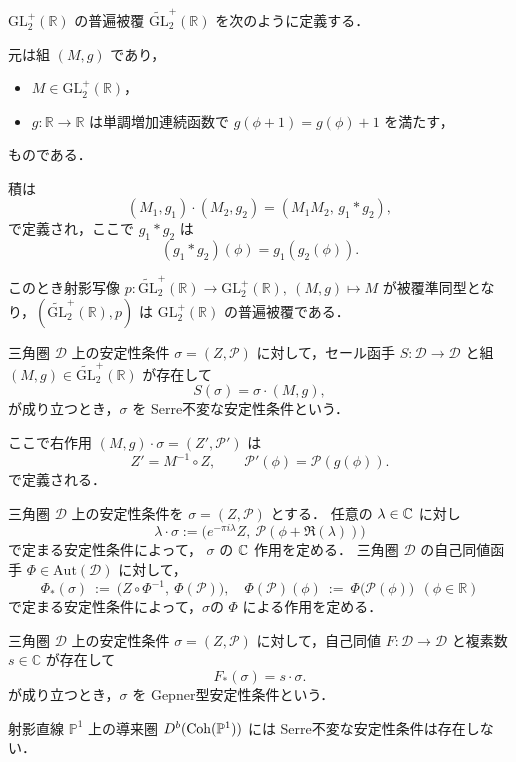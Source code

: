 \section{}
\begin{defn}
$\mathrm{GL}^+_2(\mathbb{R})$ の普遍被覆 $\widetilde{\mathrm{GL}}^+_2(\mathbb{R})$ を次のように定義する．

元は組 $(M,g)$ であり，
\begin{itemize}
  \item $M \in \mathrm{GL}^+_2(\mathbb{R})$，
  \item $g:\mathbb{R}\to\mathbb{R}$ は単調増加連続函数で $g(\phi+1)=g(\phi)+1$ を満たす，
\end{itemize}
ものである．

積は
\[
(M_1,g_1)\cdot(M_2,g_2) = (M_1M_2,\, g_1\ast g_2),
\]
で定義され，ここで $g_1\ast g_2$ は
\[
(g_1\ast g_2)(\phi) = g_1(g_2(\phi)).
\]

このとき射影写像 $p:\widetilde{\mathrm{GL}}^+_2(\mathbb{R})\to \mathrm{GL}^+_2(\mathbb{R}),\ (M,g)\mapsto M$ が被覆準同型となり，$(\widetilde{\mathrm{GL}}^+_2(\mathbb{R}),p)$ は $\mathrm{GL}^+_2(\mathbb{R})$ の普遍被覆である．
\end{defn}

\begin{defn}
三角圏 $\mathcal{D}$ 上の安定性条件 $\sigma=(Z,\mathcal{P})$ に対して，セール函手 $S:\mathcal{D}\to\mathcal{D}$ と組 $(M,g)\in \widetilde{\mathrm{GL}}^+_2(\mathbb{R})$ が存在して
\[
S(\sigma)=\sigma \cdot (M,g),
\]
が成り立つとき，$\sigma$ を Serre不変な安定性条件という．

ここで右作用 $(M,g)\cdot\sigma=(Z',\mathcal{P}')$ は
\[
	Z' = M^{-1}\circ Z,\qquad 
\mathcal{P}'(\phi)=\mathcal{P}(g(\phi)).
\]
で定義される．
\end{defn}

\begin{defn}
三角圏 $\mathcal{D}$ 上の安定性条件を $\sigma=(Z,\mathcal{P})$ とする．
任意の $\lambda\in {\mathbb C}$ に対し
\[
\lambda\cdot\sigma := \bigl(e^{-\pi i \lambda}Z,\ \mathcal{P}(\phi+\Re(\lambda))\bigr)
\]
で定まる安定性条件によって， $\sigma$ の ${\mathbb C}$ 作用を定める．
三角圏 $\mathcal{D}$ の自己同値函手 $\Phi\in \mathrm{Aut}(\mathcal{D})$ に対して，
\[
\Phi_*(\sigma)\ :=\ \bigl(Z\circ \Phi^{-1},\ \Phi(\mathcal{P})\bigr),\quad
\Phi(\mathcal{P})(\phi)\ :=\ \Phi\bigl(\mathcal{P}(\phi)\bigr)\ \ (\phi\in\mathbb{R})
\]
で定まる安定性条件によって，$\sigma$の $\Phi$ による作用を定める．
\end{defn}

\begin{defn}
三角圏 $\mathcal{D}$ 上の安定性条件 $\sigma=(Z,\mathcal{P})$ に対して，自己同値 $F:\mathcal{D}\to\mathcal{D}$ と複素数 $s\in\mathbb{C}$ が存在して
\[
	F_*(\sigma)=s\cdot \sigma.
\]
が成り立つとき，$\sigma$ を Gepner型安定性条件という．
\end{defn}


\begin{thm}
	射影直線 \(\mathbb{P}^1\) 上の導来圏 \(D^b(\operatorname{\mathrm{Coh}}({\mathbb P}^1))\) には Serre不変な安定性条件は存在しない．
\end{thm}
